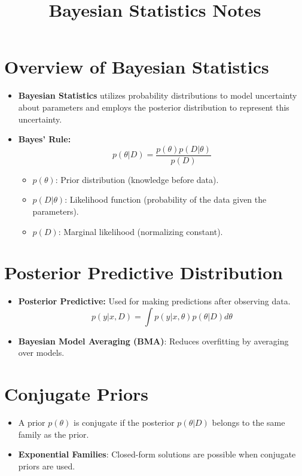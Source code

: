 \documentclass{article}
\begin{document}
\title{Bayesian Statistics Notes}
\author{}
\date{}
\maketitle

\section*{Overview of Bayesian Statistics}

\begin{itemize}
    \item \textbf{Bayesian Statistics} utilizes probability distributions to model uncertainty about parameters and employs the posterior distribution to represent this uncertainty.
    \item \textbf{Bayes' Rule:} 
    \[
    p(\theta|D) = \frac{p(\theta)p(D|\theta)}{p(D)}
    \]
    \begin{itemize}
        \item $p(\theta)$: Prior distribution (knowledge before data).
        \item $p(D|\theta)$: Likelihood function (probability of the data given the parameters).
        \item $p(D)$: Marginal likelihood (normalizing constant).
    \end{itemize}
\end{itemize}

\section*{Posterior Predictive Distribution}

\begin{itemize}
    \item \textbf{Posterior Predictive:} Used for making predictions after observing data.
    \[
    p(y|x, D) = \int p(y|x, \theta)p(\theta|D)d\theta
    \]
    \item \textbf{Bayesian Model Averaging (BMA)}: Reduces overfitting by averaging over models.
\end{itemize}

\section*{Conjugate Priors}

\begin{itemize}
    \item A prior $p(\theta)$ is conjugate if the posterior $p(\theta|D)$ belongs to the same family as the prior.
    \item \textbf{Exponential Families}: Closed-form solutions are possible when conjugate priors are used.
\end{itemize}
\end{document}
